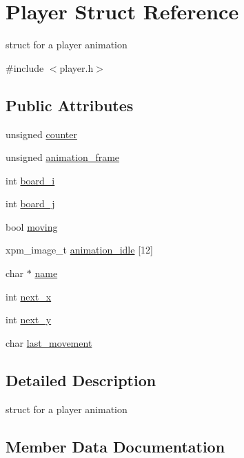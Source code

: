 \hypertarget{structPlayer}{}\section{Player Struct Reference}
\label{structPlayer}


struct for a player animation  




{\ttfamily \#include $<$player.\+h$>$}

\subsection*{Public Attributes}
\begin{DoxyCompactItemize}
\item 
unsigned \hyperlink{structPlayer_a96997d7fd96cd075a5461f388b70e411}{counter}
\item 
unsigned \hyperlink{structPlayer_a692e299113b1eb93c29f6d7069fa55f6}{animation\+\_\+frame}
\item 
int \hyperlink{structPlayer_a9b9db456166f97a2bb620919b23aa91b}{board\+\_\+i}
\item 
int \hyperlink{structPlayer_a17156154173c98e7736dc6c6d26056c9}{board\+\_\+j}
\item 
bool \hyperlink{structPlayer_aaf48c4184bee665e1f7f625dedc25adf}{moving}
\item 
xpm\+\_\+image\+\_\+t \hyperlink{structPlayer_a6b9abb8c8a4d3f6ee07fe89294d8b24b}{animation\+\_\+idle} \mbox{[}12\mbox{]}
\item 
char $\ast$ \hyperlink{structPlayer_a4af4a10433f33834b59d0c3793358a40}{name}
\item 
int \hyperlink{structPlayer_a834748101caf4cab3c42ed1619793fbf}{next\+\_\+x}
\item 
int \hyperlink{structPlayer_a8a1a06edc2b3ebae2705f1c4fc1917ff}{next\+\_\+y}
\item 
char \hyperlink{structPlayer_a7243478dde989d49cb250b1020d9f7f9}{last\+\_\+movement}
\end{DoxyCompactItemize}


\subsection{Detailed Description}
struct for a player animation 

\subsection{Member Data Documentation}
\mbox{\label{structPlayer_a692e299113b1eb93c29f6d7069fa55f6}} 
